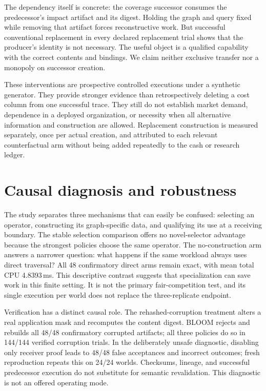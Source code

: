 The dependency itself is concrete: the coverage successor consumes the predecessor's impact artifact and its digest. Holding the graph and query fixed while removing that artifact forces reconstructive work. But successful conventional replacement in every declared replacement trial shows that the producer's identity is not necessary. The useful object is a qualified capability with the correct contents and bindings. We claim neither exclusive transfer nor a monopoly on successor creation.

These interventions are prospective controlled executions under a synthetic generator. They provide stronger evidence than retrospectively deleting a cost column from one successful trace. They still do not establish market demand, dependence in a deployed organization, or necessity when all alternative information and construction are allowed. Replacement construction is measured separately, once per actual creation, and attributed to each relevant counterfactual arm without being added repeatedly to the cash or research ledger.

\FloatBarrier
\section{Causal diagnosis and robustness}
\label{sec:causal}
The study separates three mechanisms that can easily be confused: selecting an operator, constructing its graph-specific data, and qualifying its use at a receiving boundary. The stable selection comparison offers no novel-selector advantage because the strongest policies choose the same operator. The no-construction arm answers a narrower question: what happens if the same workload always uses direct traversal? All 48 confirmatory direct arms remain exact, with mean total CPU 4.8393\,ms. This descriptive contrast suggests that specialization can save work in this finite setting. It is not the primary fair-competition test, and its single execution per world does not replace the three-replicate endpoint.

Verification has a distinct causal role. The rehashed-corruption treatment alters a real application mask and recomputes the content digest. BLOOM rejects and rebuilds all 48/48 confirmatory corrupted artifacts; all three policies do so in 144/144 verified corruption trials. In the deliberately unsafe diagnostic, disabling only receiver proof leads to 48/48 false acceptances and incorrect outcomes; fresh reproduction repeats this on 24/24 worlds. Checksums, lineage, and successful predecessor execution do not substitute for semantic revalidation. This diagnostic is not an offered operating mode.



